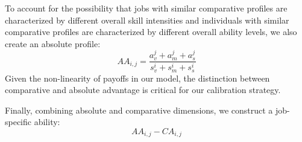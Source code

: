 \documentclass[onehalfspacing,11pt]{article}
\begin{document}
	To account for the possibility that jobs with similar comparative profiles are characterized by different overall skill intensities and individuals with similar comparative profiles are characterized by different overall ability levels, we also create an absolute profile:
	\[AA_{i,j}=\frac{a^j_v+a^j_m+a^j_s}{s^i_v+s^i_m+s^i_s}\]
	Given the non-linearity of payoffs in our model, the distinction between comparative and absolute advantage is critical for our calibration strategy.
	
	Finally, combining absolute and comparative dimensions, we construct a job-specific ability:
	\[AA_{i,j}-CA_{i,j}\]
	
	
	
	
\end{document}
